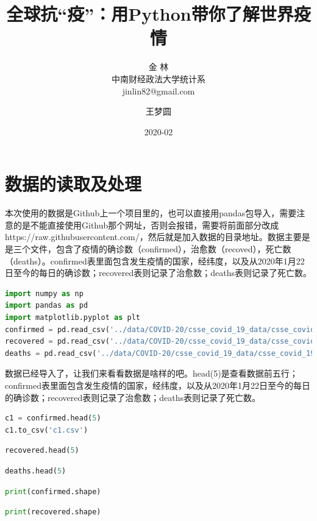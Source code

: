 \documentclass[UTF8,a4paper,12pt]{ctexart}  %
\author{\CJKfamily{kai} 金 \enspace 林 \\ \CJKfamily{kai} 中南财经政法大学统计系 \\ jinlin82@gmail.com}
\title{\LARGE\textbf{全球抗``疫''：用Python带你了解世界疫情}}
\author{王梦圆}
\date{2020-02}
\begin{document}
\maketitle

\section{数据的读取及处理}

本次使用的数据是Github上一个项目里的，也可以直接用pandas包导入，需要注意的是不能直接使用Github那个网址，否则会报错，需要将前面部分改成https://raw.githubusercontent.com/，然后就是加入数据的目录地址。数据主要是是三个文件，包含了疫情的确诊数（confirmed），治愈数（recoved），死亡数（deaths）。confirmed表里面包含发生疫情的国家，经纬度，以及从2020年1月22日至今的每日的确诊数；recovered表则记录了治愈数；deaths表则记录了死亡数。

\begin{lstlisting}[language=Python]
import numpy as np
import pandas as pd
import matplotlib.pyplot as plt
confirmed = pd.read_csv('../data/COVID-20/csse_covid_19_data/csse_covid_19_time_series/time_series_19-covid-Confirmed.csv')
recovered = pd.read_csv('../data/COVID-20/csse_covid_19_data/csse_covid_19_time_series/time_series_19-covid-Recovered.csv')
deaths = pd.read_csv('../data/COVID-20/csse_covid_19_data/csse_covid_19_time_series/time_series_19-covid-Deaths.csv')
\end{lstlisting}

数据已经导入了，让我们来看看数据是啥样的吧。head(5)是查看数据前五行；confirmed表里面包含发生疫情的国家，经纬度，以及从2020年1月22日至今的每日的确诊数；recovered表则记录了治愈数；deaths表则记录了死亡数。

\begin{lstlisting}[language=Python]
c1 = confirmed.head(5)
c1.to_csv('c1.csv')
\end{lstlisting}

\begin{lstlisting}[language=Python]
recovered.head(5)
\end{lstlisting}

\begin{lstlisting}[language=Python]
deaths.head(5)
\end{lstlisting}

\begin{lstlisting}[language=Python]
print(confirmed.shape)
\end{lstlisting}

\begin{lstlisting}[language=Python]
print(recovered.shape)
\end{lstlisting}
\end{document}
